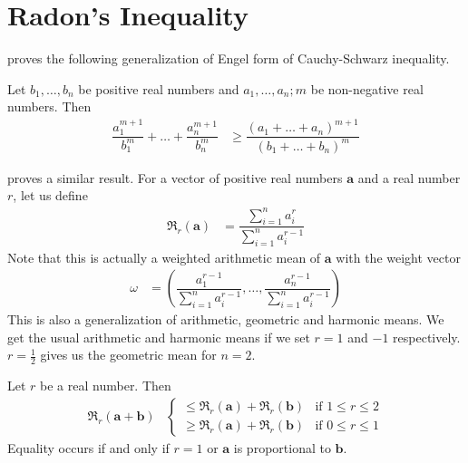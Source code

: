 \documentclass[inequalities.tex]{subfile}
\begin{document}
	\section{Radon's Inequality}\label{sec:radon}
	 \textcite{johann_radon_1913} proves the following generalization of Engel form of Cauchy-Schwarz inequality.
		\begin{theorem}\label{thm:radon}
			Let $b_{1},\ldots,b_{n}$ be positive real numbers and $a_{1},\ldots,a_{n};m$ be non-negative real numbers. Then
				\begin{align*}
					\dfrac{a_{1}^{m+1}}{b_{1}^{m}}+\ldots+\dfrac{a_{n}^{m+1}}{b_{n}^{m}}
						& \geq \dfrac{(a_{1}+\ldots+a_{n})^{m+1}}{(b_{1}+\ldots+b_{n})^{m}}
				\end{align*}
		\end{theorem}
	\textcite{beckenbach_1950} proves a similar result. For a vector of positive real numbers $\mathbf{a}$ and a real number $r$, let us define
		\begin{align*}
			\mathfrak{R}_{r}(\mathbf{a})
				& = \dfrac{\sum_{i=1}^{n}a_{i}^{r}}{\sum_{i=1}^{n}a_{i}^{r-1}}
		\end{align*}
	Note that this is actually a weighted arithmetic mean of $\mathbf{a}$ with the weight vector
		\begin{align*}
			\omega
				& = \left(\dfrac{a_{1}^{r-1}}{\sum_{i=1}^{n}a_{i}^{r-1}},\ldots,\dfrac{a_{n}^{r-1}}{\sum_{i=1}^{n}a_{i}^{r-1}}\right)
		\end{align*}
	This is also a generalization of arithmetic, geometric and harmonic means. We get the usual arithmetic and harmonic means if we set $r=1$ and $-1$ respectively. $r=\frac{1}{2}$ gives us the geometric mean for $n=2$.
		\begin{theorem}\label{thm:beckenbach}
			Let $r$ be a real number. Then
				\begin{align*}
					\mathfrak{R}_{r}(\mathbf{a}+\mathbf{b})
						& 
							\begin{cases}
								\leq \mathfrak{R}_{r}(\mathbf{a})+\mathfrak{R}_{r}(\mathbf{b}) &\mbox{if }1\leq r\leq 2\\
								\geq \mathfrak{R}_{r}(\mathbf{a})+\mathfrak{R}_{r}(\mathbf{b}) &\mbox{if }0\leq r\leq 1 
							\end{cases}
				\end{align*}
			Equality occurs if and only if $r=1$ or $\mathbf{a}$ is proportional to $\mathbf{b}$.
		\end{theorem}
\end{document}
